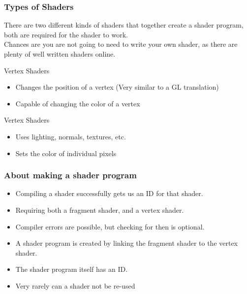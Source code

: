 \documentclass{beamer}
\begin{document}
\begin{frame}

  \frametitle{Types of Shaders}
  There are two different kinds of shaders that together create a shader program, both are required for the shader to work.\\
  Chances are you are not going to need to write your own shader, as there are plenty of well written shaders online.\\
  \begin{block}{Vertex Shaders}
    \begin{itemize}
    \item Changes the position of a vertex (Very similar to a GL translation)
    \item Capable of changing the color of a vertex
    \end{itemize}
  \end{block}

  \begin{block}{Vertex Shaders}
    \begin{itemize}
    \item Uses lighting, normals, textures, etc.
    \item Sets the color of individual pixels
    \end{itemize}
  \end{block}
\end{frame}

\begin{frame}

  \frametitle{About making a shader program}

  \begin{itemize}
  \item Compiling a shader successfully gets us an ID for that shader.
  \item Requiring both a fragment shader, and a vertex shader.
  \item Compiler errors are possible, but checking for then is optional.
  \item A shader program is created by linking the fragment shader to the vertex shader.
  \item The shader program itself has an ID.
  \item Very rarely can a shader not be re-used
  \end{itemize}

\end{frame}
\end{document}
